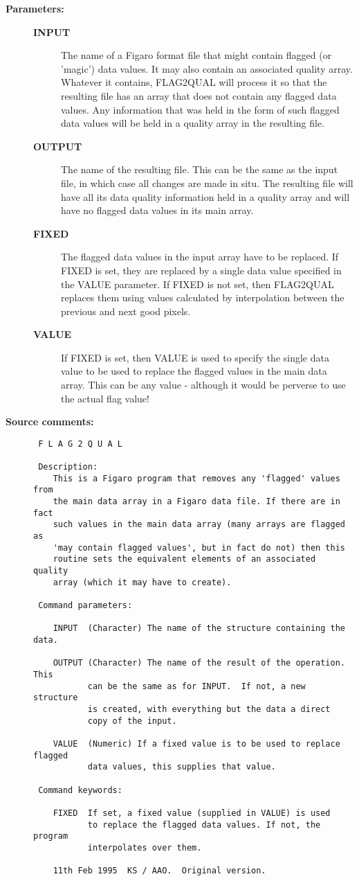 \begin{description}
\item [{\bf Parameters:}]
\begin{description}
\item [{\bf INPUT}]
 The name of a Figaro format file that might contain
 flagged (or 'magic') data values.  It may also
 contain an associated quality array. Whatever it
 contains, FLAG2QUAL will process it so that the resulting
 file has an array that does not contain any flagged data
 values. Any information that was held in the form of
 such flagged data values will be held in a quality array
 in the resulting file.
\item [{\bf OUTPUT}]
 The name of the resulting file. This can
 be the same as the input file, in which case all changes are
 made in situ. The resulting file will have all its data
 quality information held in a quality array and will have no
 flagged data values in its main array.
\item [{\bf FIXED}]
 The flagged data values in the input array have to be replaced.
 If FIXED is set, they are replaced by a single data value
 specified in the VALUE parameter. If FIXED is not set, then
 FLAG2QUAL replaces them using values calculated by
 interpolation between the previous and next good pixels.
\item [{\bf VALUE}]
 If FIXED is set, then VALUE is used to specify the single data
 value to be used to replace the flagged values in the main data
 array. This can be any value - although it would be perverse to
 use the actual flag value!
\end{description}

\item [{\bf Source comments:}]
\begin{verbatim}
 F L A G 2 Q U A L

 Description:
    This is a Figaro program that removes any 'flagged' values from
    the main data array in a Figaro data file. If there are in fact
    such values in the main data array (many arrays are flagged as
    'may contain flagged values', but in fact do not) then this
    routine sets the equivalent elements of an associated quality
    array (which it may have to create).

 Command parameters:

    INPUT  (Character) The name of the structure containing the data.

    OUTPUT (Character) The name of the result of the operation.  This
           can be the same as for INPUT.  If not, a new structure
           is created, with everything but the data a direct
           copy of the input.

    VALUE  (Numeric) If a fixed value is to be used to replace flagged
           data values, this supplies that value.

 Command keywords:

    FIXED  If set, a fixed value (supplied in VALUE) is used
           to replace the flagged data values. If not, the program
           interpolates over them.

    11th Feb 1995  KS / AAO.  Original version.

\end{verbatim}
\end{description}
